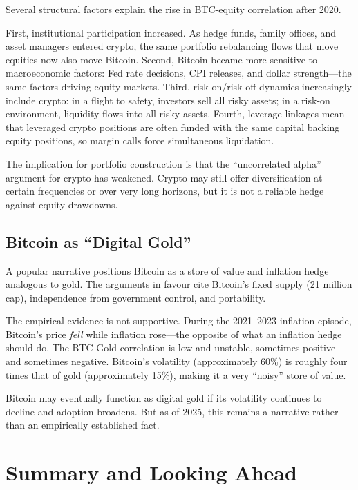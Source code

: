 \documentclass[11pt,a4paper]{article}
\begin{document}
Several structural factors explain the rise in BTC-equity correlation after 2020.

First, institutional participation increased. As hedge funds, family offices, and asset managers entered crypto, the same portfolio rebalancing flows that move equities now also move Bitcoin. Second, Bitcoin became more sensitive to macroeconomic factors: Fed rate decisions, CPI releases, and dollar strength---the same factors driving equity markets. Third, risk-on/risk-off dynamics increasingly include crypto: in a flight to safety, investors sell all risky assets; in a risk-on environment, liquidity flows into all risky assets. Fourth, leverage linkages mean that leveraged crypto positions are often funded with the same capital backing equity positions, so margin calls force simultaneous liquidation.

The implication for portfolio construction is that the ``uncorrelated alpha'' argument for crypto has weakened. Crypto may still offer diversification at certain frequencies or over very long horizons, but it is not a reliable hedge against equity drawdowns.

\subsection{Bitcoin as ``Digital Gold''}

A popular narrative positions Bitcoin as a store of value and inflation hedge analogous to gold. The arguments in favour cite Bitcoin's fixed supply (21 million cap), independence from government control, and portability.

The empirical evidence is not supportive. During the 2021--2023 inflation episode, Bitcoin's price \textit{fell} while inflation rose---the opposite of what an inflation hedge should do. The BTC-Gold correlation is low and unstable, sometimes positive and sometimes negative. Bitcoin's volatility (approximately 60\%) is roughly four times that of gold (approximately 15\%), making it a very ``noisy'' store of value.

Bitcoin may eventually function as digital gold if its volatility continues to decline and adoption broadens. But as of 2025, this remains a narrative rather than an empirically established fact.

\section{Summary and Looking Ahead}
\end{document}
